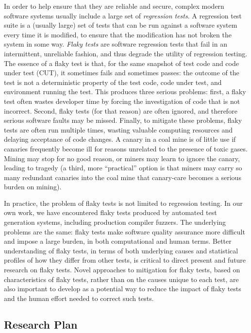\documentclass[10pt]{article}
\begin{document}
In order to help ensure that they are reliable and secure, complex modern software systems usually include a large set of \emph{regression tests}.  A regression test suite is a (usually large) set of tests that can be run against a software system every time it is modified, to ensure that the modification has not broken the system in some way.
\emph{Flaky tests} \cite{miccoflaky} are software regression tests that fail in an intermittent, unreliable fashion, and thus degrade the utility of regression testing.  The essence of a flaky test is that, for the same snapshot of test code and code under test (CUT), it sometimes fails and sometimes passes:  the outcome of the test is not a deterministic property of the test code, code under test, and environment running the test.  This produces three serious problems:  first, a flaky test often wastes developer time by forcing the investigation of code that is not incorrect.  Second, flaky tests (for that reason) are often ignored, and therefore serious software faults may be missed.  Finally, to mitigate these problems, flaky tests are often run multiple times, wasting valuable computing resources and delaying acceptance of code changes.  A canary in a coal mine is of little use if canaries frequently become ill for reasons unrelated to the presence of toxic gases.  Mining may stop for no good reason, or miners may learn to ignore the canary, leading to tragedy (a third, more ``practical'' option is that miners may carry so many redundant canaries into the coal mine that canary-care becomes a serious burden on mining).

In practice, the problem of flaky tests is not limited to regression testing.  In our own work, we have encountered flaky tests produced by automated test generation systems, including production compiler fuzzers.  The underlying problems are the same:  flaky tests make software quality assurance more difficult and impose a large burden, in both computational and human terms.  Better understanding of flaky tests, in terms of both underlying causes and statistical profiles of how they differ from other tests, is critical to direct present and future research on flaky tests.  Novel approaches to mitigation for flaky tests, based on characteristics of flaky tests, rather than on the causes unique to each test, are also important to develop as a potential way to reduce the impact of flaky tests and the human effort needed to correct such tests.

\subsection{Research Plan}
\end{document}

